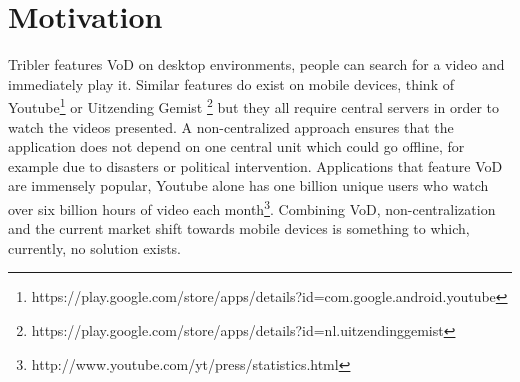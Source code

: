 \section{Motivation}
Tribler features VoD on desktop environments, people can search for a video and immediately play it. Similar features do exist on mobile devices, think of Youtube\footnote{https://play.google.com/store/apps/details?id=com.google.android.youtube} or Uitzending Gemist \footnote{https://play.google.com/store/apps/details?id=nl.uitzendinggemist} but they all require central servers in order to watch the videos presented. A non-centralized approach ensures that the application does not depend on one central unit which could go offline, for example due to disasters or political intervention. Applications that feature VoD are immensely popular, Youtube alone has one billion unique users who watch over six billion hours of video each month\footnote{http://www.youtube.com/yt/press/statistics.html}. Combining VoD, non-centralization and the current market shift towards mobile devices is something to which, currently, no solution exists.